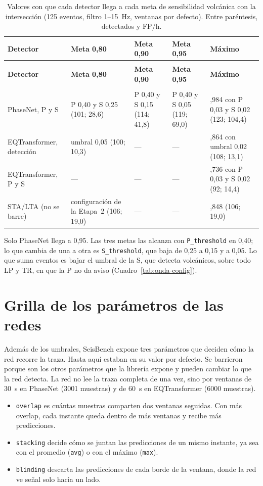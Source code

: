 \documentclass[11pt,a4paper,oneside,spanish,oldfontcommands]{memoir}
\newcommand{\cabecera}[2]{%
  \toprule #1 \\ \midrule \endfirsthead
  \multicolumn{#2}{l}{\itshape Cuadro \thetable{} (continuación)}\\
  \toprule #1 \\ \midrule \endhead
  \midrule \multicolumn{#2}{r}{\itshape Continúa en la página siguiente}\\ \endfoot
  \bottomrule \endlastfoot}
\begin{document}
{\small
\setlength{\tabcolsep}{4pt}
\begin{longtable}{>{\raggedright\arraybackslash}p{3.2cm}>{\raggedright\arraybackslash}p{2.7cm}>{\raggedright\arraybackslash}p{2.7cm}>{\raggedright\arraybackslash}p{2.7cm}>{\raggedright\arraybackslash}p{3.2cm}}
\caption{Valores con que cada detector llega a cada meta de sensibilidad volcánica con la intersección (125 eventos, filtro 1--15~Hz, ventanas por defecto). Entre paréntesis, detectados y FP/h.}\label{tab:metas-int}\\
\cabecera{\textbf{Detector} & \textbf{Meta 0,80} & \textbf{Meta 0,90} & \textbf{Meta 0,95} & \textbf{Máximo}}{5}
PhaseNet, P y S & P 0,40 y S 0,25 (101; 28,6) & P 0,40 y S 0,15 (114; 41,8) & P 0,40 y S 0,05 (119; 69,0) & 0,984 con P 0,03 y S 0,02 (123; 104,4) \\
EQTransformer, detección & umbral 0,05 (100; 10,3) & --- & --- & 0,864 con umbral 0,02 (108; 13,1) \\
EQTransformer, P y S & --- & --- & --- & 0,736 con P 0,03 y S 0,02 (92; 14,4) \\
STA/LTA (no se barre) & configuración de la Etapa~2 (106; 19,0) & --- & --- & 0,848 (106; 19,0) \\
\end{longtable}
}

Solo PhaseNet llega a 0,95. Las tres metas las alcanza con
\texttt{P\_threshold} en 0,40; lo que cambia de una a otra es \texttt{S\_threshold}, que baja de 0,25 a 0,15 y a 0,05. Lo que suma eventos es bajar el
umbral de la S, que detecta volcánicos, sobre todo LP y TR, en que la P no da
aviso (Cuadro~\ref{tab:onda-config}).

\section{Grilla de los parámetros de las redes}\label{sec:grilla}

Además de los umbrales, SeisBench expone tres parámetros que deciden cómo la
red recorre la traza. Hasta aquí estaban en su valor por defecto. Se barrieron
porque son los otros parámetros que la librería expone y pueden cambiar lo que
la red detecta. La red no lee la traza completa de una vez, sino por ventanas de 30~s en PhaseNet (3001 muestras) y de 60~s en EQTransformer (6000
muestras).

\begin{itemize}
\item \texttt{overlap} es cuántas muestras comparten dos ventanas seguidas. Con
  más overlap, cada instante queda dentro de más ventanas y recibe más
  predicciones.
\item \texttt{stacking} decide cómo se juntan las predicciones de un mismo instante, ya sea con el promedio (\texttt{avg}) o con el máximo (\texttt{max}).
\item \texttt{blinding} descarta las predicciones de cada borde de la ventana,
  donde la red ve señal solo hacia un lado.
\end{itemize}
\end{document}
